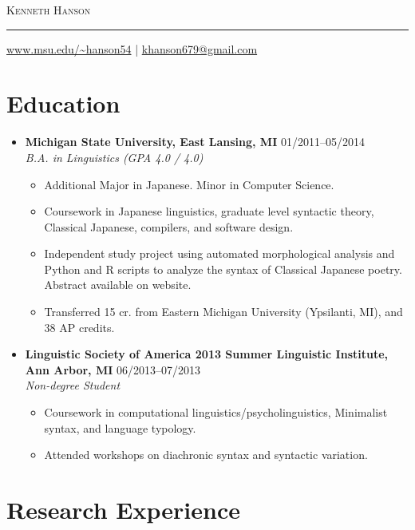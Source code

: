\documentclass[10pt,oneside]{article}
\makeatletter
\newcommand{\name}{Kenneth Hanson}
\newcommand{\email}{khanson679@gmail.com}
\newcommand{\website}{%
	\href{https://www.msu.edu/\textasciitilde hanson54}%
		 {www.msu.edu/\textasciitilde hanson54}%
}
\newcommand{\bigname}[1]{
	\begin{center}\textsc{\Huge#1}\end{center}
	\vspace{-8pt}
}
\newcommand{\ressection}[1]{
	\vspace{-12pt}
	\section*{#1}
}
\newcommand{\resbigitem}[4]{
	\item
	\textbf{#1} \hfill #2 \\
	\textit{#3} \hfill \textit{#4}
}
\makeatother
\begin{document}

\bigname{\name}

\rule{\textwidth}{1pt}

{\small \hfill \website{} | \href{mailto:\email}{\email}}


\ressection{Education}

\begin{itemize}
	\resbigitem
		{Michigan State University, East Lansing, MI}
		{01/2011--05/2014}
		{B.A. in Linguistics (GPA 4.0 / 4.0)}
		{}
	\begin{itemize}
		\item{Additional Major in Japanese. Minor in Computer Science.}
		\item{Coursework in Japanese linguistics, graduate level syntactic theory, Classical Japanese, compilers, and software design.}
		\item{Independent study project using automated morphological analysis and Python and R scripts to analyze the syntax of Classical Japanese poetry. Abstract available on website.}
		\item{Transferred 15 cr. from Eastern Michigan University (Ypsilanti, MI), and 38 AP credits.}
	\end{itemize}
	
	\resbigitem
		{Linguistic Society of America 2013 Summer Linguistic Institute, Ann Arbor, MI}
		{06/2013--07/2013}
		{Non-degree Student}
		{}
	\begin{itemize}
		\item{Coursework in computational linguistics/psycholinguistics, Minimalist syntax, and language typology.}
		\item{Attended workshops on diachronic syntax and syntactic variation.}
	\end{itemize}
\end{itemize}


\ressection{Research Experience}
\end{document}
